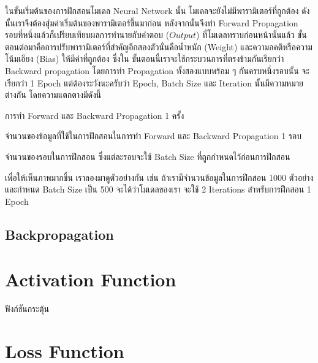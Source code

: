 ในขั้นเริ่มต้นของการฝึกสอนโมเดล Neural Network นั้น โมเดลจะยังไม่มีพารามิเตอร์ที่ถูกต้อง ดังนั้นเราจึงต้องสุ่มค่าเริ่มต้นของพารามิเตอร์ขึ้นมาก่อน
หลังจากนั้นจึงทำ Forward Propagation รอบที่หนึ่งแล้วก็เปรียบเทียบผลการทำนายกับคำตอบ ($Output$) ที่โมเดลทราบก่อนหน้านั้นแล้ว
ขั้นตอนต่อมาคือการปรับพารามิเตอร์ที่สำคัญอีกสองตัวนั่นคือน้ำหนัก (Weight) และความอคติหรือความโน้มเอียง (Bias) ให้มีค่าที่ถูกต้อง ซึ่งใน%
ขั้นตอนนี้เราจะใช้กระบวนการที่ตรงข้ามกันเรียกว่า Backward propagation โดยการทำ Propagation ทั้งสองแบบพร้อม ๆ กันครบหนึ่งรอบนั้น%
จะเรียกว่า 1 Epoch แต่ต้องระวังนะครับว่า Epoch, Batch Size และ Iteration นั้นมีความหมายต่างกัน โดยความแตกตางมีดังนี้

\begin{description}[font=$\bullet$~\normalfont\scshape\bfseries\color{red!50!black}]
    \item[1 Epoch] การทำ Forward และ Backward Propagation 1 ครั้ง
    \item[Batch Size] จำนวนของข้อมูลที่ใช้ในการฝึกสอนในการทำ Forward และ Backward Propagation 1 รอบ
    \item[Iteration] จำนวนของรอบในการฝึกสอน ซึ่งแต่ละรอบจะใช้ Batch Size ที่ถูกกำหนดไว้ก่อนการฝึกสอน
\end{description}

เพื่อให้เห็นภาพมากขึ้น เราลองมาดูตัวอย่างกัน เช่น ถ้าเรามีจำนวนข้อมูลในการฝึกสอน 1000 ตัวอย่างและกำหนด Batch Size เป็น 500 จะได้ว่าโมเดลของเรา%
จะใช้ 2 Iterations สำหรับการฝึกสอน 1 Epoch

\subsection{Backpropagation}
\label{sec:backprop}

\section{Activation Function}
\label{sec:act_func}

ฟังก์ชันกระตุ้น

\section{Loss Function}
\label{sec:loss_func}

